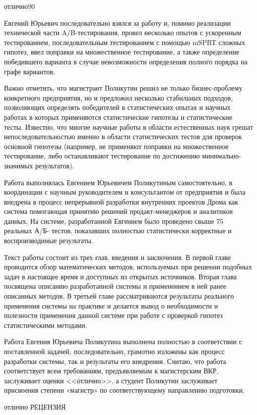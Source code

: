 \documentclass{fefu}
\begin{document}
\begin{supervisorreview}{отлично}{90}{}
    	\par Евгений Юрьевич последовательно взялся за работу и, помимо реализации технической части A/B-тестирования, провел несколько опытов с ускоренным тестированием, последовательным тестированием с помощью mSPRT сложных гипотез, ввел поправки на множественное тестирование, а также определение победившего варианта в случае невозможности определения полного порядка на графе вариантов.
    	\par Важно отметить, что магистрант Поликутин решил не только бизнес-проблему конкретного предприятия, но и предложил несколько стабильных подходов, позволяющих определять победителей в статистических опытах и научных работах в которых применяются статистические гипотезы и статистические тесты. Известно, что многие научные работы в области естественных наук грешат непоследовательностью именно в области статистических тестов для проверок основной гипотезы (например, не применяют поправки на множественное тестирование, либо останавливают тестирование по достижению минимально-значимых результатов). 
    	\par Работа выполнялась Евгением Юрьевичем Поликутиным самостоятельно, в координации с научным руководителем и консультантом от предприятия и была внедрена в процесс непрерывной разработки внутренних проектов Дрома как система помогающая принятию решений продакт-менеджеров и аналитиков данных. На системе, разработанной Евгением было проведено свыше 75 реальных А/Б- тестов, показавших полностью статистически корректные и воспроизводимые результаты. 
    	\par Текст работы состоит из трех глав, введения и заключения. В первой главе проводится обзор математических методов, используемых при решении подобных задач в настоящее время и доступных из открытых источников. Вторая глава посвящена описанию разработанной системы и применением в ней ранее описанных методов. В третьей главе рассматриваются результаты реального применения системы на практике и делается вывод о необходимости и полезности применения данной системе при работе с проверкой гипотез статистическими методами.
    	\par Работа Евгения Юрьевича Поликутина выполнена полностью в соответствии с поставленной задачей, последовательно, грамотно изложены как процесс разработки системы, так и результаты его внедрения. Считаю, что работа соответствует всем требованиям, предъявляемым к магистерским ВКР, заслуживает оценки <<отлично>>, а студент Поликутин заслуживает присвоения степени «магистр» по соответствующему направлению подготовки.
    \end{supervisorreview}
    \begin{review}{отлично}{}
    	РЕЦЕНЗИЯ
    \end{review}
\end{document}
